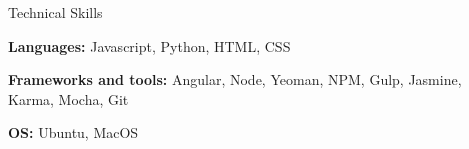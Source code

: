\begin{rubric}{Technical Skills}

  \entry* \textbf{Languages:} Javascript, Python, HTML, CSS

  \entry* \textbf{Frameworks and tools:} Angular, Node, Yeoman, NPM, Gulp, Jasmine, Karma, Mocha, Git

  \entry* \textbf{OS:} Ubuntu, MacOS


\end{rubric}
